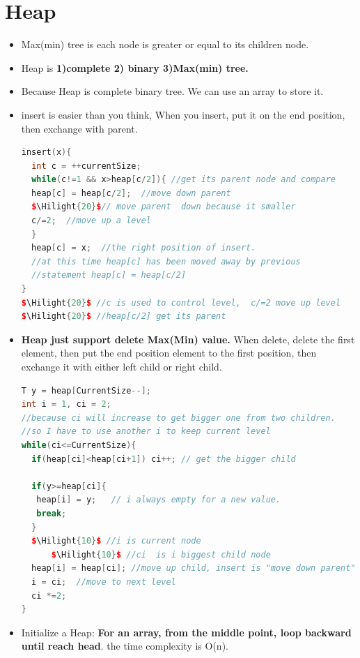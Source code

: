 \documentclass[a4paper,12pt,twoside]{book}
\newcommand{\Hilight}[1]{\makebox[0pt][l]{\color{yellow}\rule[-3pt]{#1em}{11pt}}}
\begin{document}
\section{Heap}

\begin{itemize}
\item Max(min) tree is each node is greater or equal to its children node.
\item Heap is \textbf{1)complete 2) binary 3)Max(min) tree.}
\item Because Heap is complete binary tree. We can use an array to store it. 
\item insert is easier than you think, When you insert, put it on the end position, then exchange with parent.  

\begin{lstlisting}[frame=single, language=c++, mathescape=true]
insert(x){
  int c = ++currentSize;
  while(c!=1 && x>heap[c/2]){ //get its parent node and compare
  heap[c] = heap[c/2];  //move down parent
  $\Hilight{20}$// move parent  down because it smaller
  c/=2;  //move up a level 
  }  
  heap[c] = x;  //the right position of insert. 
  //at this time heap[c] has been moved away by previous 
  //statement heap[c] = heap[c/2] 
}
$\Hilight{20}$ //c is used to control level,  c/=2 move up level
$\Hilight{20}$ //heap[c/2] get its parent
\end{lstlisting}

\item \textbf{Heap just support delete Max(Min) value.} When delete, delete the first element, then put the end position element to the first position, then exchange it with either left child or right child. 
\begin{lstlisting}[frame=single, language=c++, mathescape=true]
T y = heap[CurrentSize--];
int i = 1, ci = 2;
//because ci will increase to get bigger one from two children.
//so I have to use another i to keep current level
while(ci<=CurrentSize){
  if(heap[ci]<heap[ci+1]) ci++; // get the bigger child
  
  if(y>=heap[ci]{
   heap[i] = y;   // i always empty for a new value. 
   break; 
  }
  $\Hilight{10}$ //i is current node
      $\Hilight{10}$ //ci  is i biggest child node
  heap[i] = heap[ci]; //move up child, insert is "move down parent"
  i = ci;  //move to next level
  ci *=2;
}
\end{lstlisting}
\item Initialize a Heap: \textbf{For an array, from the middle point, loop backward until reach  head}. the time complexity is O(n). 


\end{itemize}
\end{document}
